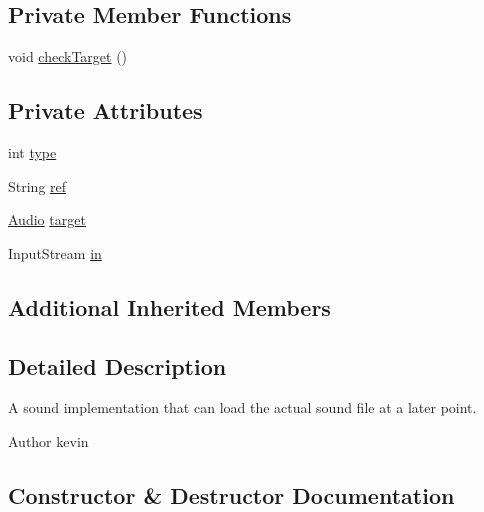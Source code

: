 \subsection*{Private Member Functions}
\begin{DoxyCompactItemize}
\item 
void \mbox{\hyperlink{classorg_1_1newdawn_1_1slick_1_1openal_1_1_deferred_sound_a63fc1a65a177fcaeb93ba0a071c10086}{check\+Target}} ()
\end{DoxyCompactItemize}
\subsection*{Private Attributes}
\begin{DoxyCompactItemize}
\item 
int \mbox{\hyperlink{classorg_1_1newdawn_1_1slick_1_1openal_1_1_deferred_sound_aaebd240dac7c3e4dba3a81fe174a9028}{type}}
\item 
String \mbox{\hyperlink{classorg_1_1newdawn_1_1slick_1_1openal_1_1_deferred_sound_adfed2acfb0cb1ef789edfc3102fa682c}{ref}}
\item 
\mbox{\hyperlink{interfaceorg_1_1newdawn_1_1slick_1_1openal_1_1_audio}{Audio}} \mbox{\hyperlink{classorg_1_1newdawn_1_1slick_1_1openal_1_1_deferred_sound_ab156655c2d91c0a6bbec8bd4438ac875}{target}}
\item 
Input\+Stream \mbox{\hyperlink{classorg_1_1newdawn_1_1slick_1_1openal_1_1_deferred_sound_a3abbd7ab8edc3ba6fc29e0a62388b898}{in}}
\end{DoxyCompactItemize}
\subsection*{Additional Inherited Members}


\subsection{Detailed Description}
A sound implementation that can load the actual sound file at a later point.

\begin{DoxyAuthor}{Author}
kevin 
\end{DoxyAuthor}


\subsection{Constructor \& Destructor Documentation}
\mbox{\label{classorg_1_1newdawn_1_1slick_1_1openal_1_1_deferred_sound_a8861b7f487cf1d467a062106b9045fbb}} 
